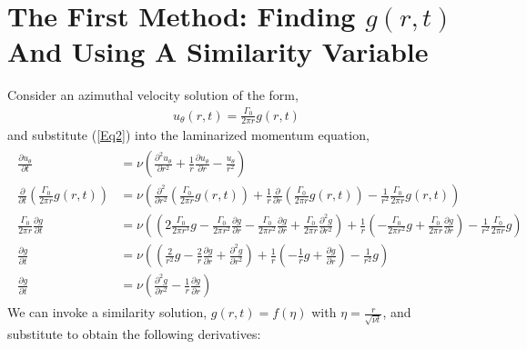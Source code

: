 \documentclass{article}
\begin{document}
\section{The First Method: Finding $g(r,t)$ And Using A Similarity Variable}
Consider an azimuthal velocity solution of the form, 
\begin{align}\label{Eq2}
    u_\theta (r,t)=\frac{\Gamma_0}{2\pi r}g(r,t)
\end{align}
and substitute (\ref{Eq2}) into the laminarized momentum equation,
\begin{align}\label{Eq3}
\begin{split}
    \frac{\partial u_\theta}{\partial t}&=\nu \left(\frac{\partial^2 u_\theta}{\partial r^2}+\frac{1}{r}\frac{\partial u_\theta}{\partial r} -\frac{u_\theta}{r^2}\right)\\
    \frac{\partial}{\partial t}\left( \frac{\Gamma_0}{2\pi r}g(r,t)\right) &=\nu \left(\frac{\partial^2}{\partial r^2}\left( \frac{\Gamma_0}{2\pi r}g(r,t)\right)+\frac{1}{r}\frac{\partial}{\partial r}\left( \frac{\Gamma_0}{2\pi r}g(r,t)\right) -\frac{1}{r^2}\frac{\Gamma_0}{2\pi r}g(r,t)\right)\\
    \frac{\Gamma_0}{2\pi r}\frac{\partial g}{\partial t} &=\nu \left(\left( 2\frac{\Gamma_0}{2\pi r^3}g -\frac{\Gamma_0}{2\pi r^2}\frac{\partial g}{\partial r} -\frac{\Gamma_0}{2\pi r^2}\frac{\partial g}{\partial r}+\frac{\Gamma_0}{2\pi r}\frac{\partial^2 g}{\partial r^2}  \right)+\frac{1}{r} \left( -\frac{\Gamma_0}{2\pi r^2}g +\frac{\Gamma_0}{2\pi r}\frac{\partial g}{\partial r} \right) -\frac{1}{r^2}\frac{\Gamma_0}{2\pi r}g\right)\\
    \frac{\partial g}{\partial t} &=\nu \left(\left( \frac{2}{r^2}g -\frac{2}{r}\frac{\partial g}{\partial r} + \frac{\partial^2 g}{\partial r^2}  \right)+\frac{1}{r} \left( -\frac{1}{r}g +\frac{\partial g}{\partial r} \right) -\frac{1}{r^2}g\right)\\
    \frac{\partial g}{\partial t} &=\nu \left( \frac{\partial^2 g}{\partial r^2} - \frac{1}{r}\frac{\partial g}{\partial r} \right)
\end{split}
\end{align}
We can invoke a similarity solution, $g(r,t)=f(\eta)$ with $\eta =\frac{r}{\sqrt{\nu t}}$, and substitute to obtain the following derivatives:
\end{document}
